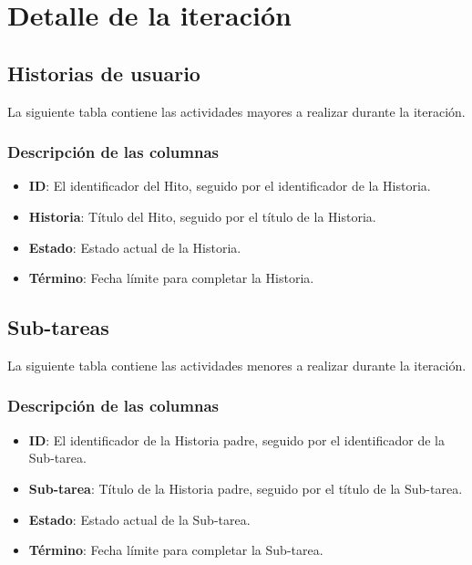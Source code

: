 \chapter{Detalle de la iteración}

\section{Historias de usuario}
La siguiente tabla contiene las actividades mayores a realizar 
durante la iteración.

\subsection{Descripción de las columnas}
\begin{itemize}
  \item \textbf{ID}: El identificador del Hito, seguido por el identificador de la Historia.
  \item \textbf{Historia}: Título del Hito, seguido por el título de la Historia.
  \item \textbf{Estado}: Estado actual de la Historia.
  \item \textbf{Término}: Fecha límite para completar la Historia.
\end{itemize}



\pagebreak

\section{Sub-tareas}
La siguiente tabla contiene las actividades menores a realizar 
durante la iteración.

\subsection{Descripción de las columnas}
\begin{itemize}
  \item \textbf{ID}: El identificador de la Historia padre, seguido por el identificador de la Sub-tarea.
  \item \textbf{Sub-tarea}: Título de la Historia padre, seguido por el título de la Sub-tarea.
  \item \textbf{Estado}: Estado actual de la Sub-tarea.
  \item \textbf{Término}: Fecha límite para completar la Sub-tarea.
\end{itemize}

